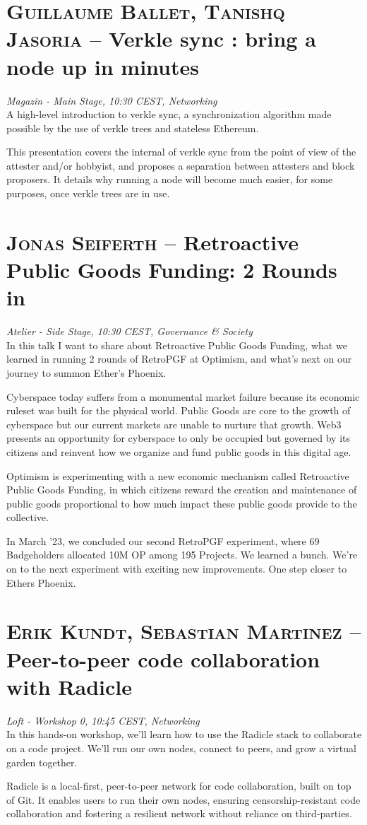 \section {\textsc{Guillaume Ballet, Tanishq Jasoria} -- Verkle sync : bring a node up in minutes
} \noindent \textit {Magazin - Main Stage, 10:30 CEST, Networking
}\\[1em] A high-level introduction to verkle sync, a synchronization algorithm made possible by the use of verkle trees and stateless Ethereum.
\par This presentation covers the internal of verkle sync from the point of view of the attester and/or hobbyist, and proposes a separation between attesters and block proposers. It details why running a node will become much easier, for some purposes, once verkle trees are in use.
\clearpage
\section {\textsc{Jonas Seiferth} -- Retroactive Public Goods Funding: 2 Rounds in
} \noindent \textit {Atelier - Side Stage, 10:30 CEST, Governance \&
 Society
}\\[1em] In this talk I want to share about Retroactive Public Goods Funding, what we learned in running 2 rounds of RetroPGF at Optimism, and what's next on our journey to summon Ether's Phoenix.
\par Cyberspace today suffers from a monumental market failure because its economic ruleset was built for the physical world. Public Goods are core to the growth of cyberspace but our current markets are unable to nurture that growth. Web3 presents an opportunity for cyberspace to only be occupied but governed by its citizens and reinvent how we organize and fund public goods in this digital age.

Optimism is experimenting with a new economic mechanism called Retroactive Public Goods Funding, in which citizens reward the creation and maintenance of public goods proportional to how much impact these public goods provide to the collective.

In March '23, we concluded our second RetroPGF experiment, where 69 Badgeholders allocated 10M OP among 195 Projects. We learned a bunch. We're on to the next experiment with exciting new improvements. One step closer to Ethers Phoenix.
\clearpage
\section {\textsc{Erik Kundt, Sebastian Martinez} -- Peer-to-peer code collaboration with Radicle
} \noindent \textit {Loft - Workshop 0, 10:45 CEST, Networking
}\\[1em] In this hands-on workshop, we'll learn how to use the Radicle stack to collaborate on a code project. We'll run our own nodes, connect to peers, and grow a virtual garden together.
\par Radicle is a local-first, peer-to-peer network for code collaboration, built on top of Git. It enables users to run their own nodes, ensuring censorship-resistant code collaboration and fostering a resilient network without reliance on third-parties.

